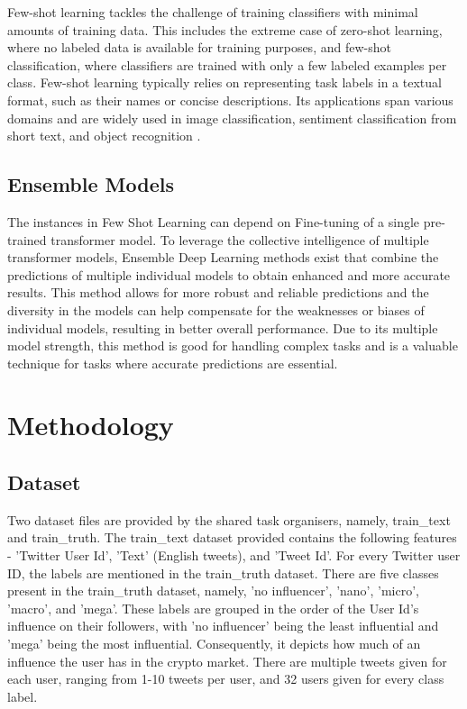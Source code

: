 \documentclass[]{ceurart}
\begin{document}
Few-shot learning tackles the challenge of training classifiers with minimal amounts of training data. This includes the extreme case of zero-shot learning, where no labeled data is available for training purposes, and few-shot classification, where classifiers are trained with only a few labeled examples per class. Few-shot learning typically relies on representing task labels in a textual format, such as their names or concise descriptions. Its applications span various domains and are widely used in image classification, sentiment classification from short text, and object recognition \cite{chinearios2022zero}.

\subsection{Ensemble Models}
The instances in Few Shot Learning can depend on Fine-tuning of a single pre-trained transformer model. To leverage the collective intelligence of multiple transformer models, Ensemble Deep Learning methods exist that combine the predictions of multiple individual models to obtain enhanced and more accurate results. This method allows for more robust and reliable predictions and the diversity in the models can help compensate for the weaknesses or biases of individual models, resulting in better overall performance. Due to its multiple model strength, this method is good for handling complex tasks and is a valuable technique for tasks where accurate predictions are essential.

\section{Methodology}

\subsection{Dataset}
Two dataset files are provided by the shared task organisers, namely, train\_text and train\_truth. The train\_text dataset provided contains the following features - 'Twitter User Id', 'Text' (English tweets), and 'Tweet Id'. For every Twitter user ID, the labels are mentioned in the train\_truth dataset. There are five classes present in the train\_truth dataset, namely, 'no influencer', 'nano', 'micro', 'macro', and 'mega'. These labels are grouped in the order of the User Id's influence on their followers, with 'no influencer' being the least influential and 'mega' being the most influential. Consequently, it depicts how much of an influence the user has in the crypto market. There are multiple tweets given for each user, ranging from 1-10 tweets per user, and 32 users given for every class label.
\end{document}
